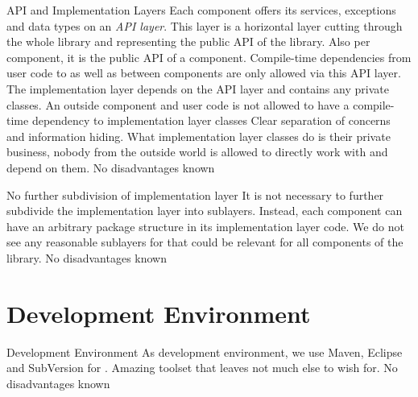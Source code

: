 
{%
API and Implementation Layers
}
{%
Each component offers its services, exceptions and data types on an \emph{API layer}. This layer is a horizontal layer cutting through the whole library and representing the public API of the library. Also per component, it is the public API of a component. Compile-time dependencies from user code to \LibName{} as well as between components are only allowed via this API layer. The implementation layer depends on the API layer and contains any private classes. An outside component and user code is not allowed to have a compile-time dependency to implementation layer classes
}
{%
Clear separation of concerns and information hiding. What implementation layer classes do is their private business, nobody from the outside world is allowed to directly work with and depend on them.
}
{%
No disadvantages known
}


{%
No further subdivision of implementation layer
}
{%
It is not necessary to further subdivide the implementation layer into sublayers. Instead, each component can have an arbitrary package structure in its implementation layer code.
}
{%
We do not see any reasonable sublayers for \LibName{} that could be relevant for all components of the library.
}
{%
No disadvantages known
}


\section{Development Environment}
\label{sec:entw}

{%
Development Environment
}
{%
As development environment, we use Maven, Eclipse and SubVersion for \LibName{}.
}
{%
Amazing toolset that leaves not much else to wish for.
}
{%
No disadvantages known
}

